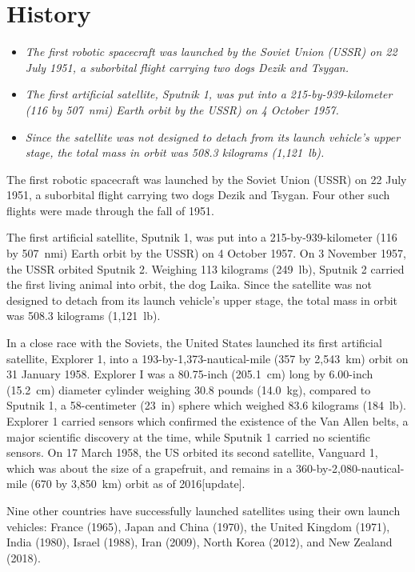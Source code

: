 \section{History}\label{history}

\begin{itemize}
\item
  \emph{The first robotic spacecraft was launched by the Soviet Union
  (USSR) on 22 July 1951, a suborbital flight carrying two dogs Dezik
  and Tsygan.}
\item
  \emph{The first artificial satellite, Sputnik 1, was put into a
  215-by-939-kilometer (116 by 507~nmi) Earth orbit by the USSR) on 4
  October 1957.}
\item
  \emph{Since the satellite was not designed to detach from its launch
  vehicle's upper stage, the total mass in orbit was 508.3 kilograms
  (1,121~lb).}
\end{itemize}

The first robotic spacecraft was launched by the Soviet Union (USSR) on
22 July 1951, a suborbital flight carrying two dogs Dezik and Tsygan.
Four other such flights were made through the fall of 1951.

The first artificial satellite, Sputnik 1, was put into a
215-by-939-kilometer (116 by 507~nmi) Earth orbit by the USSR) on 4
October 1957. On 3 November 1957, the USSR orbited Sputnik 2. Weighing
113 kilograms (249~lb), Sputnik 2 carried the first living animal into
orbit, the dog Laika. Since the satellite was not designed to detach
from its launch vehicle's upper stage, the total mass in orbit was 508.3
kilograms (1,121~lb).

In a close race with the Soviets, the United States launched its first
artificial satellite, Explorer 1, into a 193-by-1,373-nautical-mile (357
by 2,543~km) orbit on 31 January 1958. Explorer I was a 80.75-inch
(205.1~cm) long by 6.00-inch (15.2~cm) diameter cylinder weighing 30.8
pounds (14.0~kg), compared to Sputnik 1, a 58-centimeter (23~in) sphere
which weighed 83.6 kilograms (184~lb). Explorer 1 carried sensors which
confirmed the existence of the Van Allen belts, a major scientific
discovery at the time, while Sputnik 1 carried no scientific sensors. On
17 March 1958, the US orbited its second satellite, Vanguard 1, which
was about the size of a grapefruit, and remains in a
360-by-2,080-nautical-mile (670 by 3,850~km) orbit as of
2016{[}update{]}.

Nine other countries have successfully launched satellites using their
own launch vehicles: France (1965), Japan and China (1970), the United
Kingdom (1971), India (1980), Israel (1988), Iran (2009), North Korea
(2012), and New Zealand (2018).

